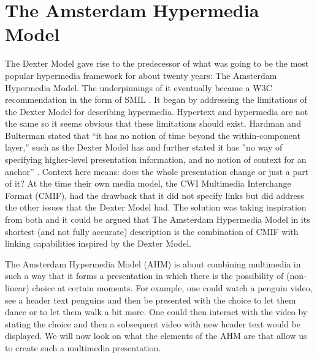\section{The Amsterdam Hypermedia Model}
The Dexter Model gave rise to the predecessor of what was going to be the most popular hypermedia framework for about twenty years: The Amsterdam Hypermedia Model. The underpinnings of it eventually became a W3C recommendation in the form of SMIL \cite{ossenbruggen2001}. It began by addressing the limitations of the Dexter  Model for describing hypermedia. Hypertext and hypermedia are not the same so it seems obvious that these limitations should exist. Hardman and Bulterman stated that ``it has no notion of time beyond the within-component layer,'' \cite{hardman1994} such as the Dexter Model has and further stated it has ''no way of specifying higher-level presentation information, and no notion of context for an anchor'' \cite{hardman1994}. Context here means: does the whole presentation change or just a part of it? At the time their own media model, the CWI Multimedia Interchange Format (CMIF), had the drawback that it did not specify links but did address the other issues that the Dexter Model had. The solution was taking inspiration from both and it could be argued that The Amsterdam Hypermedia Model in its shortest (and not fully accurate) description is the combination of CMIF with linking capabilities inspired by the Dexter Model. 

The Amsterdam Hypermedia Model (AHM) is about combining multimedia in such a way that it forms a presentation in which there is the possibility of (non-linear) choice at certain moments. For example, one could watch a penguin video, see a header text penguins and then be presented with the choice to let them dance or to let them walk a bit more. One could then interact with the video by stating the choice and then a subsequent video with new header text would be displayed. We will now look on what the elements of the AHM are that allow us to create such a multimedia presentation.


